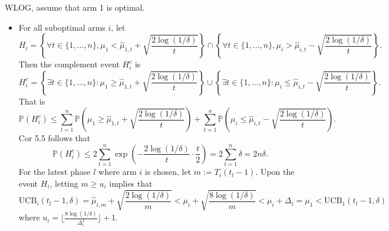 \documentclass[10pt]{article}
\theoremstyle{definition}
\newenvironment{solution*}[1]{%
  \IfBlankTF{#1}
    {\renewcommand{\themanualsolutioninner}{\unskip}}
    {\renewcommand\themanualsolutioninner{#1}}%
  \manualsolutioninner
}{\endmanualsolutioninner}
\begin{document}
\begin{solution*}{}
    \leavevmode
    WLOG, assume that arm 1 is optimal.
    \begin{itemize}
        \item[(a)] For all suboptimal arms $i$, let
        \begin{equation*}
            H_i = \left\{ \forall t \in \{1, \ldots, n\}, \mu_1 < \hat{\mu}_{1,t}+\sqrt{\frac{2 \log(1/\delta)}{t}} \right\} 
            \cap \left\{ \forall t \in \{1, \ldots, n\}, \mu_i > \hat{\mu}_{i,t}-\sqrt{\frac{2 \log(1/\delta)}{t}} \right\}.
        \end{equation*}
        Then the complement event $H_i^c$ is
        \begin{equation*}
            H_i^c = \left\{ \exists t \in \{1, \ldots, n\} : \mu_1 \geq \hat{\mu}_{1,t}+\sqrt{\frac{2 \log(1/\delta)}{t}} \right\} \cup \left\{ \exists t \in \{1, \ldots, n\} : \mu_i \leq \hat{\mu}_{i,t}-\sqrt{\frac{2 \log(1/\delta)}{t}} \right\}.
        \end{equation*}
        That is
        \begin{equation*}
            \mathbb{P}(H_i^c) \leq \sum_{t=1}^n \mathbb{P}\left( \mu_1 \geq \hat{\mu}_{1,t}+\sqrt{\frac{2 \log(1/\delta)}{t}} \right) + \sum_{t=1}^n \mathbb{P}\left( \mu_i \leq \hat{\mu}_{i,t}-\sqrt{\frac{2 \log(1/\delta)}{t}} \right).
        \end{equation*}
        Cor 5.5 follows that
        \begin{equation*}
            \mathbb{P}(H_i^c) \leq 2\sum_{t=1}^n \exp\left(-\frac{2 \log(1/\delta)}{t} \cdot \frac{t}{2}\right) = 2\sum_{t=1}^n \delta = 2 n \delta.
        \end{equation*}
        For the latest phase $l$ where arm $i$ is chosen, let $m:= T_i(t_l -1)$. Upon the event $H_i$, letting $m \geq u_i$ implies that
        \begin{equation*}
            \text{UCB}_i(t_l -1, \delta) = \hat{\mu}_{i,m} + \sqrt{\frac{2 \log(1/\delta)}{m}} < \mu_i + \sqrt{\frac{8 \log(1/\delta)}{m}} < \mu_i + \Delta_i = \mu_1 < \text{UCB}_1(t_l -1, \delta)
        \end{equation*}
        where $u_i = \lfloor \frac{8 \log(1/\delta)}{\Delta_i^2} \rfloor + 1$.
        

\end{itemize}
\end{solution*}
\end{document}
